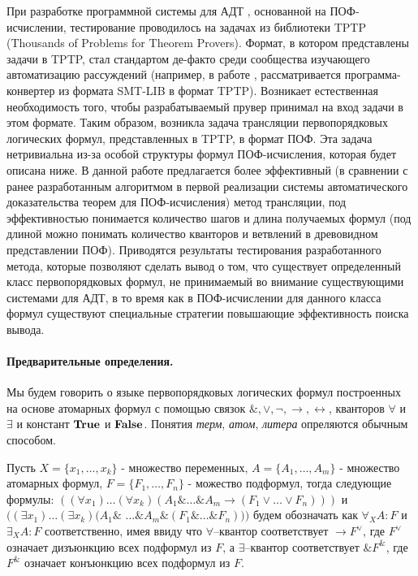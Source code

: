 \documentclass[a4paper]{jctart15b}
\begin{document}
При разработке программной системы для АДТ \cite{mipro2013}, основанной на ПОФ-исчислении, тестирование проводилось на задачах из библиотеки TPTP \cite{tptp} (Thousands of Problems for Theorem Provers). Формат, в котором представлены задачи в TPTP, стал стандартом де-факто среди сообщества изучающего автоматизацию рассуждений (например, в работе \cite{SMTtoTPTP}, рассматривается программа-конвертер из формата SMT-LIB в формат TPTP). Возникает естественная необходимость того, чтобы разрабатываемый прувер принимал на вход задачи в этом формате. Таким образом, возникла задача трансляции первопорядковых логических формул, представленных в TPTP, в формат ПОФ. Эта задача нетривиальна из-за особой структуры формул ПОФ-исчисления, которая будет описана ниже. В данной работе предлагается более эффективный (в сравнении с ранее разработанным алгоритмом в первой реализации системы автоматического доказательства теорем для ПОФ-исчисления\cite{Cherkashin}) метод трансляции, под эффективностью понимается количество шагов и длина получаемых формул (под длиной можно понимать количество кванторов и ветвлений в древовидном представлении ПОФ). Приводятся результаты тестирования разработанного метода, которые позволяют сделать вывод о том, что существует определенный класс первопорядковых формул, не принимаемый во внимание существующими системами для АДТ, в то время как в ПОФ-исчислении для данного класса формул существуют специальные стратегии повышающие эффективность поиска вывода.

\paragraph{Предварительные определения.}

Мы будем говорить о языке первопорядковых логических формул построенных на основе атомарных формул с помощью связок  $\&, \vee, \neg, \rightarrow, \leftrightarrow$, кванторов $\forall$ и $\exists$ и констант $\text{\textbf{True}}$ и $\text{\textbf{False}}$. Понятия \emph{терм}, \emph{атом}, \emph{литера} опреляются обычным способом.

Пусть $X = \{x_1,\ldots,x_k\}$ - множество переменных, $A = \{A_1,\ldots,A_m\}$ - множество атомарных формул, $F = \{F_1,\ldots,F_n\}$ - можество подформул, тогда следующие формулы: $((\forall x_1) \ldots (\forall x_k) (A_1 \& \ldots \& A_m \rightarrow (F_1 \vee \ldots \vee F_n)))$ и $((\exists x_1) \ldots (\exists x_k) (A_1 \&$ $\ldots \& A_m \& (F_1 \& \ldots \& F_n)))$ будем обозначать как $\forall_XA\colon F$ и $\exists_XA\colon F$ соответственно, имея ввиду что $\forall$--квантор соответствует $\rightarrow F^{\vee}$, где $F^{\vee}$ означает дизъюнкцию всех подформул из $F$, а $\exists$--квантор соответствует $\& F^{\&}$, где $F^{\&}$ означает конъюнкцию всех подформул из $F$.
\end{document}
